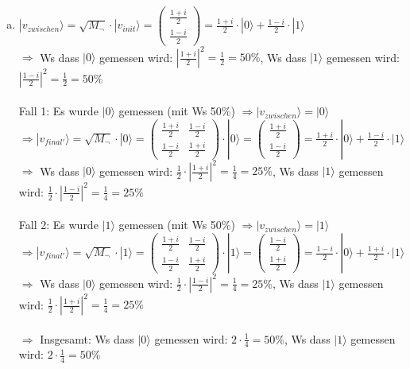 \documentclass[a4paper]{scrartcl}
\begin{document}
\begin{enumerate}[a)]
\item $|v_{zwischen}\rangle=\sqrt{M_\neg}\cdot |v_{init}\rangle=\begin{pmatrix}\frac{1+i}{2}\\\frac{1-i}{2}\end{pmatrix}=\frac{1+i}{2}\cdot |0\rangle+\frac{1-i}{2}\cdot |1\rangle$\\
$\Rightarrow$ Ws dass $|0\rangle$ gemessen wird: $|\frac{1+i}{2}|^2=\frac{1}{2}=50\%$, Ws dass $|1\rangle$ gemessen wird: $|\frac{1-i}{2}|^2=\frac{1}{2}=50\%$\\\\
Fall 1: Es wurde $|0\rangle$ gemessen (mit Ws 50\%)
$\Rightarrow |v_{zwischen}\rangle=|0\rangle$\\
$\Rightarrow |v_{final'}\rangle=\sqrt{M_\neg}\cdot |0\rangle= \begin{pmatrix}\frac{1+i}{2} & \frac{1-i}{2}\\\frac{1-i}{2}&\frac{1+i}{2}\end{pmatrix}\cdot |0\rangle= \begin{pmatrix}\frac{1+i}{2}\\\frac{1-i}{2}\end{pmatrix}=\frac{1+i}{2}\cdot |0\rangle+\frac{1-i}{2}\cdot |1\rangle$\\
$\Rightarrow$ Ws dass $|0\rangle$ gemessen wird: $\frac{1}{2}\cdot|\frac{1+i}{2}|^2=\frac{1}{4}=25\%$, Ws dass $|1\rangle$ gemessen wird: $\frac{1}{2}\cdot|\frac{1-i}{2}|^2=\frac{1}{4}=25\%$\\\\
Fall 2: Es wurde $|1\rangle$ gemessen (mit Ws 50\%)
$\Rightarrow |v_{zwischen}\rangle=|1\rangle$\\
$\Rightarrow |v_{final'}\rangle=\sqrt{M_\neg}\cdot |1\rangle= \begin{pmatrix}\frac{1+i}{2} & \frac{1-i}{2}\\\frac{1-i}{2}&\frac{1+i}{2}\end{pmatrix}\cdot |1\rangle= \begin{pmatrix}\frac{1-i}{2}\\\frac{1+i}{2}\end{pmatrix}=\frac{1-i}{2}\cdot |0\rangle+\frac{1+i}{2}\cdot |1\rangle$\\
$\Rightarrow$ Ws dass $|0\rangle$ gemessen wird: $\frac{1}{2}\cdot|\frac{1-i}{2}|^2=\frac{1}{4}=25\%$, Ws dass $|1\rangle$ gemessen wird: $\frac{1}{2}\cdot|\frac{1+i}{2}|^2=\frac{1}{4}=25\%$\\\\
$\Rightarrow$ Insgesamt: Ws dass $|0\rangle$ gemessen wird: $2\cdot\frac{1}{4}=50\%$, Ws dass $|1\rangle$ gemessen wird: $2\cdot\frac{1}{4}=50\%$

\end{enumerate}
\end{document}
